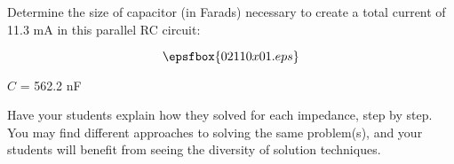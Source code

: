 

Determine the size of capacitor (in Farads) necessary to create a total current of 11.3 mA in this parallel RC circuit:

$$\epsfbox{02110x01.eps}$$







$C$ = 562.2 nF







Have your students explain how they solved for each impedance, step by step.  You may find different approaches to solving the same problem(s), and your students will benefit from seeing the diversity of solution techniques.




